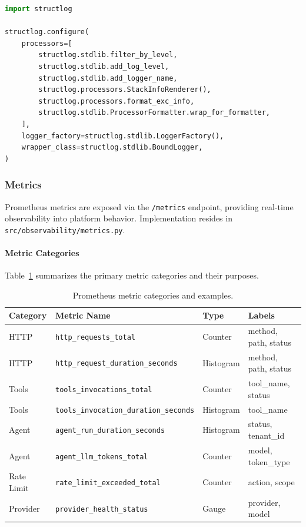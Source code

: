 \begin{lstlisting}[language=Python, caption={Structured logging configuration pattern.}]
import structlog

structlog.configure(
    processors=[
        structlog.stdlib.filter_by_level,
        structlog.stdlib.add_log_level,
        structlog.stdlib.add_logger_name,
        structlog.processors.StackInfoRenderer(),
        structlog.processors.format_exc_info,
        structlog.stdlib.ProcessorFormatter.wrap_for_formatter,
    ],
    logger_factory=structlog.stdlib.LoggerFactory(),
    wrapper_class=structlog.stdlib.BoundLogger,
)
\end{lstlisting}

\subsubsection{Metrics}

Prometheus metrics are exposed via the \texttt{/metrics} endpoint, providing real-time observability into platform behavior. Implementation resides in \texttt{src/observability/metrics.py}.

\paragraph{Metric Categories}
Table~\ref{tab:metric-categories} summarizes the primary metric categories and their purposes.

\begin{table}[htbp]
    \centering
    \caption{Prometheus metric categories and examples.}
    \label{tab:metric-categories}
    \small
    \begin{tabular}{llll}
        \toprule
        \textbf{Category} & \textbf{Metric Name} & \textbf{Type} & \textbf{Labels} \\
        \midrule
        HTTP & \texttt{http\_requests\_total} & Counter & method, path, status \\
        HTTP & \texttt{http\_request\_duration\_seconds} & Histogram & method, path, status \\
        Tools & \texttt{tools\_invocations\_total} & Counter & tool\_name, status \\
        Tools & \texttt{tools\_invocation\_duration\_seconds} & Histogram & tool\_name \\
        Agent & \texttt{agent\_run\_duration\_seconds} & Histogram & status, tenant\_id \\
        Agent & \texttt{agent\_llm\_tokens\_total} & Counter & model, token\_type \\
        Rate Limit & \texttt{rate\_limit\_exceeded\_total} & Counter & action, scope \\
        Provider & \texttt{provider\_health\_status} & Gauge & provider, model \\
        \bottomrule
    \end{tabular}
\end{table}

